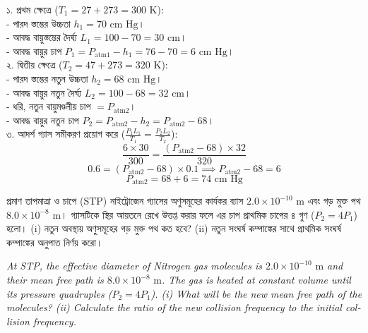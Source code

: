 \documentclass[12pt, a4paper]{article}
\begin{document}
\begin{tcolorbox}[solutionbox={সমাধান (Solution)}]
\noindent
১. প্রথম ক্ষেত্রে ($T_1 = 27 + 273 = 300\text{ K}$): \\
- পারদ স্তম্ভের উচ্চতা $h_1 = 70\text{ cm Hg}$। \\
- আবদ্ধ বায়ুস্তম্ভের দৈর্ঘ্য $L_1 = 100 - 70 = 30\text{ cm}$। \\
- আবদ্ধ বায়ুর চাপ $P_1 = P_{\text{atm1}} - h_1 = 76 - 70 = 6\text{ cm Hg}$। \\
২. দ্বিতীয় ক্ষেত্রে ($T_2 = 47 + 273 = 320\text{ K}$): \\
- পারদ স্তম্ভের নতুন উচ্চতা $h_2 = 68\text{ cm Hg}$। \\
- আবদ্ধ বায়ুর নতুন দৈর্ঘ্য $L_2 = 100 - 68 = 32\text{ cm}$। \\
- ধরি, নতুন বায়ুমণ্ডলীয় চাপ $= P_{\text{atm2}}$। \\
- আবদ্ধ বায়ুর নতুন চাপ $P_2 = P_{\text{atm2}} - h_2 = P_{\text{atm2}} - 68$। \\
৩. আদর্শ গ্যাস সমীকরণ প্রয়োগ করে ($\frac{P_1 L_1}{T_1} = \frac{P_2 L_2}{T_2}$):
\[ \frac{6 \times 30}{300} = \frac{(P_{\text{atm2}} - 68) \times 32}{320} \]
\[ 0.6 = (P_{\text{atm2}} - 68) \times 0.1 \implies P_{\text{atm2}} - 68 = 6 \]
\[ P_{\text{atm2}} = 68 + 6 = 74\text{ cm Hg} \]
\end{tcolorbox}

\vspace{1.5em}

\begin{tcolorbox}[questionbox={প্রশ্ন (Question) 7}]
\noindent
প্রমাণ তাপমাত্রা ও চাপে (STP) নাইট্রোজেন গ্যাসের অণুসমূহের কার্যকর ব্যাস $2.0 \times 10^{-10}\text{ m}$ এবং গড় মুক্ত পথ $8.0 \times 10^{-8}\text{ m}$। গ্যাসটিকে স্থির আয়তনে রেখে উত্তপ্ত করার ফলে এর চাপ প্রাথমিক চাপের ৪ গুণ ($P_2 = 4 P_1$) হলো। (i) নতুন অবস্থায় অণুসমূহের গড় মুক্ত পথ কত হবে? (ii) নতুন সংঘর্ষ কম্পাঙ্কের সাথে প্রাথমিক সংঘর্ষ কম্পাঙ্কের অনুপাত নির্ণয় করো।

\vspace{0.8em}
\begin{english}
\noindent\textit{\color{darkgray}
At STP, the effective diameter of Nitrogen gas molecules is $2.0 \times 10^{-10}\text{ m}$ and their mean free path is $8.0 \times 10^{-8}\text{ m}$. The gas is heated at constant volume until its pressure quadruples ($P_2 = 4 P_1$). (i) What will be the new mean free path of the molecules? (ii) Calculate the ratio of the new collision frequency to the initial collision frequency.
}
\end{english}
\end{tcolorbox}
\end{document}
